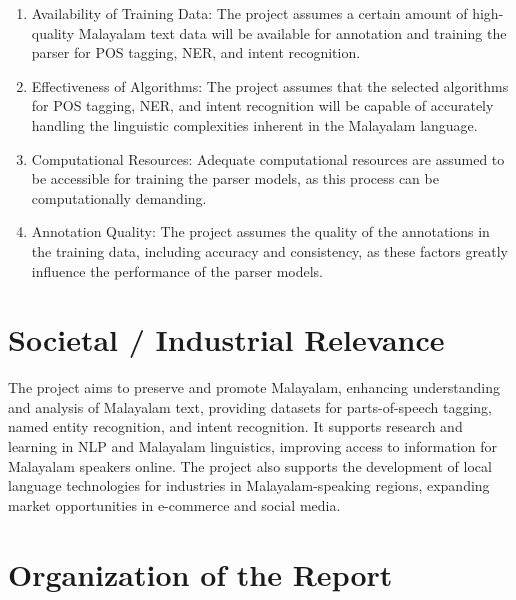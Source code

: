 \documentclass[12pt,a4paper,titlepage]{report}
\begin{document}
	\begin{enumerate}
		\item Availability of Training Data: The project assumes a certain amount of high-quality Malayalam text data will be available for annotation and training the parser for POS tagging, NER, and intent recognition.
		\item Effectiveness of Algorithms: The project assumes that the selected algorithms for POS tagging, NER, and intent recognition will be capable of accurately handling the linguistic complexities inherent in the Malayalam language.
		\item Computational Resources: Adequate computational resources are assumed to be accessible for training the parser models, as this process can be computationally demanding.
		\item Annotation Quality: The project assumes the quality of the annotations in the training data, including accuracy and consistency, as these factors greatly influence the performance of the parser models.
		
	\end{enumerate}
	
	
	\section{Societal / Industrial Relevance}
	
	The project aims to preserve and promote Malayalam, enhancing understanding and analysis of Malayalam text, providing datasets for parts-of-speech tagging, named entity recognition, and intent recognition. It supports research and learning in NLP and Malayalam linguistics, improving access to information for Malayalam speakers online. The project also supports the development of local language technologies for industries in Malayalam-speaking regions, expanding market opportunities in e-commerce and social media.
	

	\section{Organization of the Report}
	
\end{document}
